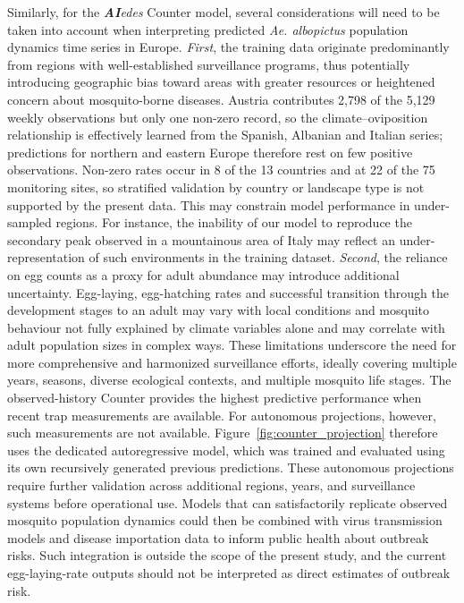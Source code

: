 \documentclass[preprint,12pt]{elsarticle}
\begin{document}
Similarly, for the \textit{\textbf{AI}edes} Counter model, several considerations will need to be taken into account when interpreting predicted \textit{Ae. albopictus} population dynamics time series in Europe.
\textit{First}, the training data originate predominantly from regions with well-established surveillance programs, thus potentially introducing geographic bias toward areas with greater resources or heightened concern about mosquito-borne diseases. Austria contributes 2,798 of the 5,129 weekly observations but only one non-zero record, so the climate--oviposition relationship is effectively learned from the Spanish, Albanian and Italian series; predictions for northern and eastern Europe therefore rest on few positive observations. Non-zero rates occur in 8 of the 13 countries and at 22 of the 75 monitoring sites, so stratified validation by country or landscape type is not supported by the present data. This may constrain model performance in under-sampled regions. For instance, the inability of our model to reproduce the secondary peak observed in a mountainous area of Italy may reflect an under-representation of such environments in the training dataset. 
\textit{Second}, the reliance on egg counts as a proxy for adult abundance may introduce additional uncertainty. Egg-laying, egg-hatching rates and successful transition through the development stages to an adult may vary with local conditions and mosquito behaviour not fully explained by climate variables alone and may correlate with adult population sizes in complex ways. These limitations underscore the need for more comprehensive and harmonized surveillance efforts, ideally covering multiple years, seasons, diverse ecological contexts, and multiple mosquito life stages.
The observed-history Counter provides the highest predictive performance when recent trap measurements are available. For autonomous projections, however, such measurements are not available. Figure~\ref{fig:counter_projection} therefore uses the dedicated autoregressive model, which was trained and evaluated using its own recursively generated previous predictions. These autonomous projections require further validation across additional regions, years, and surveillance systems before operational use.
Models that can satisfactorily replicate observed mosquito population dynamics could then be combined with virus transmission models and disease importation data to inform public health about outbreak risks. Such integration is outside the scope of the present study, and the current egg-laying-rate outputs should not be interpreted as direct estimates of outbreak risk.
\end{document}
